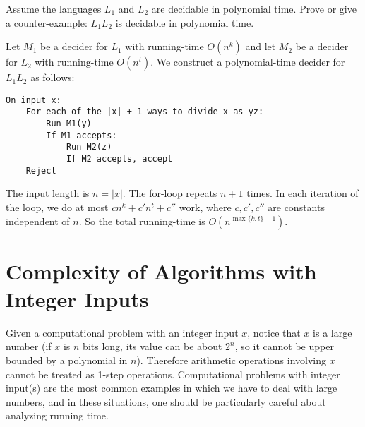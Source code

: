 \begin{flex}
\label{grp:exercise:Is-polynomial-time-decidability-closed-under-concatenation}

\begin{exercise}
\label{exercise:Is-polynomial-time-decidability-closed-under-concatenation}
Assume the languages $L_1$ and $L_2$ are decidable in polynomial time. Prove or give a counter-example: $L_1L_2$ is decidable in polynomial time.

\end{exercise}

\begin{solution}
\label{sol:time-complexity::decider}
Let $M_1$ be a decider for $L_1$ with running-time $O(n^k)$ and let $M_2$ be a decider for $L_2$ with running-time $O(n^t)$. We construct a polynomial-time decider for $L_1L_2$ as follows:

\begin{verbatim}
On input x:
    For each of the |x| + 1 ways to divide x as yz:
        Run M1(y)
        If M1 accepts:
            Run M2(z)
            If M2 accepts, accept
    Reject
\end{verbatim}

The input length is $n = |x|$. The for-loop repeats $n+1$ times. In each iteration of the loop, we do at most $cn^k + c'n^t + c''$ work, where $c, c', c''$ are constants independent of $n$. So the total running-time is $O(n^{\max\{k,t\}+1})$.

\end{solution}
\end{flex}


\section{Complexity of Algorithms with Integer Inputs}
\label{sec:time-complexity::complexity-of-algorithms-with-integer-inputs}

\begin{important}
\label{important:Integer-inputs-are-large-numbers}
Given a computational problem with an integer input $x$, notice that $x$ is a large number (if $x$ is $n$ bits long, its value can be about $2^n$, so it cannot be upper bounded by a polynomial in $n$). Therefore arithmetic operations involving $x$ cannot be treated as 1-step operations. Computational problems with integer input(s) are the most common examples in which we have to deal with large numbers, and in these situations, one should be particularly careful about analyzing running time.

\end{important}

